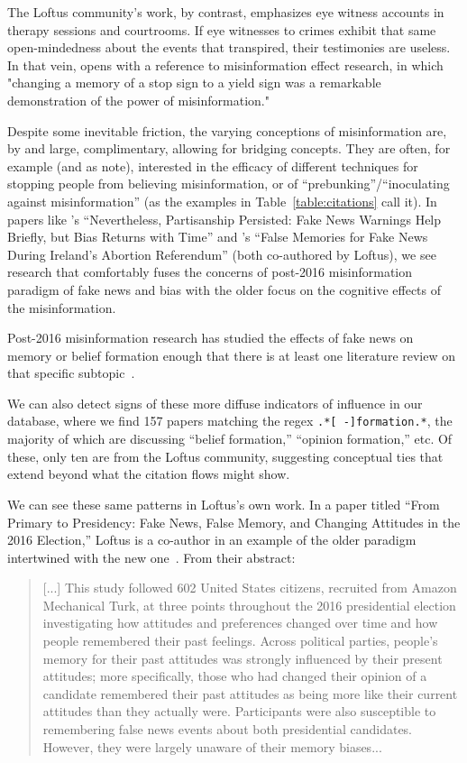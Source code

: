 \documentclass[          
 pre,
 twocolumn,
 twoside,
 superscriptaddress,
 amsmath,
 amssymb,                
 apsf
]{revtex4-2}
\begin{document}
The Loftus community's work, by contrast, emphasizes eye witness accounts in therapy sessions and courtrooms. If eye witnesses to crimes exhibit that same open-mindedness about the events that transpired, their testimonies are useless. In that vein, \citet{lewandowskyMisinformationUnderstandingCoping2017} opens with a reference to misinformation effect research, in which "changing a memory of a stop sign to a yield sign was a remarkable demonstration of the power of misinformation."

Despite some inevitable friction, the varying conceptions of misinformation are, by and large, complimentary, allowing for bridging concepts. They are often, for example (and as \citet{hymanMisinformationWorldviewsPosttruth2017} note), interested in the efficacy of different techniques for stopping people from believing misinformation, or of ``prebunking''/``inoculating against misinformation'' (as the examples in Table~\ref{table:citations} call it). In papers like \citet{gradyNeverthelessPartisanshipPersisted2021}'s ``Nevertheless, Partisanship Persisted: Fake News Warnings Help Briefly, but Bias Returns with Time'' and \citet{murphyFalseMemoriesFake2019}'s ``False Memories for Fake News During Ireland's Abortion Referendum'' (both co-authored by Loftus), we see research that comfortably fuses the concerns of post-2016 misinformation paradigm of fake news and bias with the older focus on the cognitive effects of the misinformation. 

Post-2016 misinformation research has studied the effects of fake news on memory or belief formation enough that there is at least one literature review on that specific subtopic~\cite{faedda_fake_2024}.  

We can also detect signs of these more diffuse indicators of influence in our database, where we find 157 papers matching the regex \texttt{.*[ -]formation.*}, the majority of which are discussing ``belief formation,'' ``opinion formation,'' etc. Of these, only ten are from the Loftus community, suggesting conceptual ties that extend beyond what the citation flows might show.

We can see these same patterns in Loftus's own work. In a paper titled ``From Primary to Presidency: Fake News, False Memory, and Changing Attitudes in the 2016 Election,'' Loftus is a co-author in an example of the older paradigm intertwined with the new one~\cite{grady_primary_2023}. From their abstract:

\begin{quote}
    [...] This study followed 602 United States citizens, recruited from Amazon Mechanical Turk, at three points throughout the 2016 presidential election investigating how attitudes and preferences changed over time and how people remembered their past feelings. Across political parties, people’s memory for their past attitudes was strongly influenced by their present attitudes; more specifically, those who had changed their opinion of a candidate remembered their past attitudes as being more like their current attitudes than they actually were. Participants were also susceptible to remembering false news events about both presidential candidates. However, they were largely unaware of their memory biases...
\end{quote}
\end{document}
